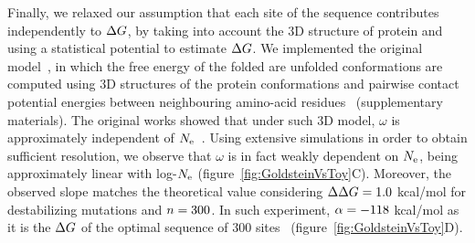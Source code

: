 Finally, we relaxed our assumption that each site of the sequence contributes independently to $\Delta G$, by taking into account the $3$D structure of protein and using a statistical potential to estimate $\Delta G$.
We implemented the original model~\citep{Williams2006, Goldstein2011, Pollock2012}, in which the free energy of the folded are unfolded conformations are computed using $3$D structures of the protein conformations and pairwise contact potential energies between neighbouring amino-acid residues~\citep{Miyazawa1985} (supplementary materials).
The original works showed that under such $3$D model, $\omega$ is approximately independent of $N_{\mathrm{e}}$~\citep{Goldstein2013}.
Using extensive simulations in order to obtain sufficient resolution, we observe that $\omega$ is in fact weakly dependent on $N_{\mathrm{e}}$, being approximately linear with log-$N_{\mathrm{e}}$ (figure~\ref{fig:GoldsteinVsToy}C).
Moreover, the observed slope matches the theoretical value considering $\Delta \Delta G = 1.0$ kcal/mol for destabilizing mutations and $n=300$.
In such experiment, $\alpha=-118$ kcal/mol as it is the $\Delta G$ of the optimal sequence of $300$ sites~\citep{Goldstein2011} (figure~\ref{fig:GoldsteinVsToy}D).
